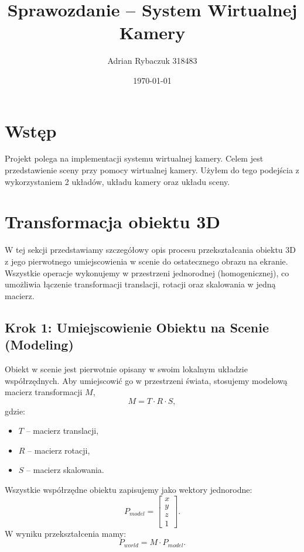 \documentclass[a4paper,12pt]{article}
\title{Sprawozdanie – System Wirtualnej Kamery}
\author{Adrian Rybaczuk 318483}
\date{\today}
\begin{document}
\maketitle
\tableofcontents
\newpage

\section{Wstęp}

Projekt polega na implementacji systemu wirtualnej kamery. Celem jest przedstawienie sceny przy pomocy wirtualnej kamery. Użyłem do tego podejścia z wykorzystaniem 2 układów, układu kamery oraz układu sceny.

\section{Transformacja obiektu 3D}

W tej sekcji przedstawiamy szczegółowy opis procesu przekształcania obiektu 3D z jego pierwotnego umiejscowienia w scenie do ostatecznego obrazu na ekranie. Wszystkie operacje wykonujemy w przestrzeni jednorodnej (homogenicznej), co umożliwia łączenie transformacji translacji, rotacji oraz skalowania w jedną macierz.

\subsection{Krok 1: Umiejscowienie Obiektu na Scenie (Modeling)}
Obiekt w scenie jest pierwotnie opisany w swoim lokalnym układzie współrzędnych. Aby umiejscowić go w przestrzeni świata, stosujemy modelową macierz transformacji \( M \),
\[
M = T \cdot R \cdot S,
\]
gdzie:
\begin{itemize}
    \item \( T \) – macierz translacji,
    \item \( R \) – macierz rotacji,
    \item \( S \) – macierz skalowania.
\end{itemize}
Wszystkie współrzędne obiektu zapisujemy jako wektory jednorodne:
\[
P_{model} = \begin{bmatrix} x \\ y \\ z \\ 1 \end{bmatrix}.
\]
W wyniku przekształcenia mamy:
\[
P_{world} = M \cdot P_{model}.
\]
\end{document}
